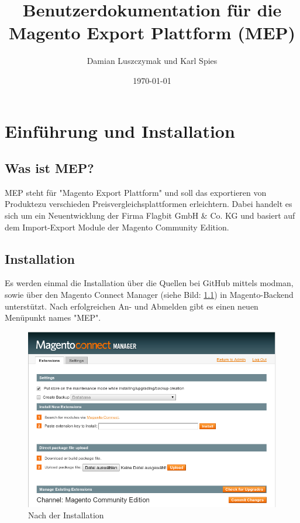 \documentclass[a4paper,12pt]{book}
\author{Damian Luszczymak und Karl Spies}
\date{\today}
\title{Benutzerdokumentation für die Magento Export Plattform (MEP)}
\begin{document}
\maketitle

\tableofcontents
\listoffigures

\pagestyle{headings}

\chapter{Einführung und Installation}

\section{Was ist MEP?}
MEP steht für "Magento Export Plattform" und soll das exportieren von
Produktezu verschieden Preisvergleichsplattformen erleichtern. Dabei
handelt es sich um ein Neuentwicklung der Firma Flagbit GmbH \& Co. KG
und basiert auf dem Import-Export Module der Magento Community Edition.

\section{Installation}
Es werden einmal die Installation über die Quellen bei GitHub mittels
modman, sowie über den Magento Connect Manager (siehe Bild: \ref{figure:install}) in
Magento-Backend unterstützt.  Nach erfolgreichen An- und Abmelden gibt
es einen neuen Menüpunkt names "MEP".

\begin{figure}
 \includegraphics[width=1\textwidth]{img/bild01.png}
  \caption{Nach der Installation}
  \label{figure:install}
\end{figure}
\end{document}

